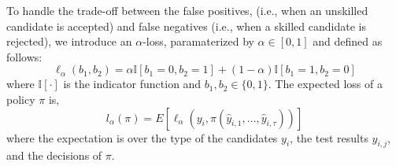 To handle the trade-off between the false positives, 
(i.e., when an unskilled candidate is accepted) 
and false negatives 
(i.e., when a skilled candidate is rejected), 
we introduce an $\alpha$-loss, 
paramaterized by $\alpha \in [0,1]$ and defined as follows:
\begin{equation*}
\ell_{\alpha}(b_1,b_2)=\alpha \mathbb{I}[b_1=0,b_2=1] + (1-\alpha)\mathbb{I}[b_1=1,b_2=0]
\end{equation*}
where $\mathbb{I}[\cdot]$ is the indicator function and $b_1,b_2\in\{0,1\}$. The expected loss of a policy $\pi$ is,
\begin{equation}\label{loss}
    l_\alpha(\pi)=E[\ell_{\alpha}(y_i,\pi(\hat{y}_{i,1},\dots,\hat{y}_{i,\tau}))] 
\end{equation}
where the expectation is over the type of the candidates $y_i$, the test results $\hat{y}_{i,j}$, and the decisions of $\pi$.